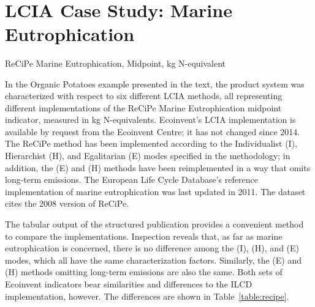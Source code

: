 \
\section{LCIA Case Study: Marine Eutrophication}
\renewcommand{\bottomfraction}{.8}
\begin{table}[b]
  \footnotesize\sffamily
  \caption{ReCiPe Marine Eutrophication, Midpoint, kg N-equivalent}
  \label{table:recipe}
  
\end{table}

In the Organic Potatoes example presented in the text, the product system was characterized with respect to six different LCIA methods, all representing different implementations of the ReCiPe Marine Eutrophication midpoint indicator, measured in kg N-equivalents.  Ecoinvent's LCIA implementation is available by request from the Ecoinvent Centre; it has not changed since 2014. The ReCiPe method has been implemented according to the Individualist (I), Hierarchist (H), and Egalitarian (E) modes specified in the methodology; in addition, the (E) and (H) methods have been reimplemented in a way that omits long-term emissions.  The European Life Cycle Database's reference implementation of marine eutrophication was last updated in 2011.  The dataset cites the 2008 version of ReCiPe.

The tabular output of the structured publication provides a convenient method to compare the implementations. Inspection reveals that, as far as marine eutrophication  is concerned, there is no difference among the (I), (H), and (E) modes, which all have the same characterization factors.  Similarly, the (E) and (H) methods omitting long-term emissions are also the same.  Both sets of Ecoinvent indicators bear similarities and differences to the ILCD implementation, however.  The differences are shown in Table~\ref{table:recipe}.

